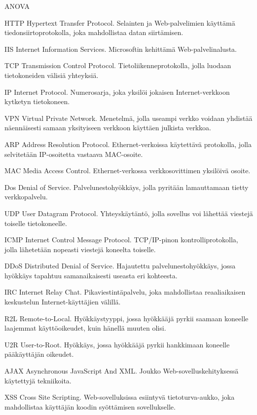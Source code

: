 
\termlist

\begin{abbrlist}{ANOVA}
\item[HTTP]     Hypertext Transfer Protocol. Selainten ja Web-palvelimien käyttämä tiedonsiirtoprotokolla, joka mahdollistaa datan siirtämisen.
\item[IIS]      Internet Information Services. Microsoftin kehittämä Web-palvelinalusta.
\item[TCP]	Transmission Control Protocol. Tietoliikenneprotokolla, jolla luodaan tietokoneiden välisiä yhteyksiä.
\item[IP]	Internet Protocol. Numerosarja, joka yksilöi jokaisen Internet-verkkoon kytketyn tietokoneen.
\item[VPN]	Virtual Private Network. Menetelmä, jolla useampi verkko voidaan yhdistää näennäisesti samaan yksityiseen verkkoon käyttäen julkista verkkoa. 
\item[ARP]	Address Resolution Protocol. Ethernet-verkoissa käytettävä protokolla, jolla selvitetään IP-osoitetta vastaava MAC-osoite.
\item[MAC]	Media Access Control. Ethernet-verkossa verkkosovittimen yksilöivä osoite.
\item[Dos]	Denial of Service. Palvelunestohyökkäys, jolla pyritään lamauttamaan tietty verkkopalvelu.
\item[UDP]	User Datagram Protocol. Yhteyskäytäntö, jolla sovellus voi lähettää viestejä toiselle tietokoneelle.
\item[ICMP]	Internet Control Message Protocol. TCP/IP-pinon kontrolliprotokolla, jolla lähetetään nopeasti viestejä koneelta toiselle.
\item[DDoS]	Distributed Denial of Service. Hajautettu palvelunestohyökkäys, jossa hyökkäys tapahtuu samanaikaisesti useasta eri kohteesta.
\item[IRC]	Internet Relay Chat. Pikaviestintäpalvelu, joka mahdollistaa reaaliaikaisen keskustelun Internet-käyttäjien välillä.
\item[R2L]	Remote-to-Local. Hyökkäystyyppi, jossa hyökkääjä pyrkii saamaan koneelle laajemmat käyttöoikeudet, kuin hänellä muuten olisi.
\item[U2R]	User-to-Root. Hyökkäys, jossa hyökkääjä pyrkii hankkimaan koneelle pääkäyttäjän oikeudet.
\item[AJAX]	Asynchronous JavaScript And XML. Joukko Web-sovelluskehityksessä käytettyjä tekniikoita.
\item[XSS]	Cross Site Scripting. Web-sovelluksissa esiintyvä tietoturva-aukko, joka mahdollistaa käyttäjän koodin syöttämisen sovellukselle.  

\end{abbrlist}
